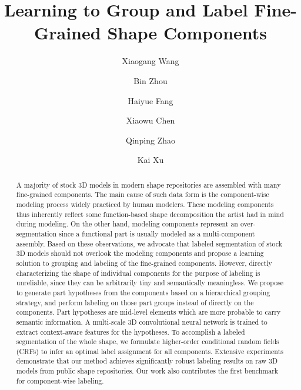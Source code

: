 \documentclass[acmtog]{acmart}
\newcommand{\new}[1]{{\color{black}#1}}
\newcommand{\wang}[1]{{\color{black}#1}}
\begin{document}


\title{Learning to Group and Label Fine-Grained Shape Components}


\author{Xiaogang Wang}
\author{Bin Zhou}
\author{Haiyue Fang}
\author{Xiaowu Chen}
\author{Qinping Zhao}
\author{Kai Xu}


\begin{abstract}
\new{A majority of stock 3D models in modern shape repositories are assembled
with many fine-grained components.
The main cause of such data form is the component-wise modeling process widely practiced by human modelers. These modeling components thus inherently reflect some function-based shape decomposition
the artist had in mind during modeling. On the other hand, modeling components represent
an over-segmentation since a functional part is usually modeled as a multi-component assembly.
Based on these observations, we advocate that labeled segmentation of stock 3D models
should not overlook the modeling components and propose a learning solution
to grouping and labeling of the fine-grained components.
However, directly characterizing the shape of individual components for the purpose of
labeling is unreliable, since they can be arbitrarily tiny and semantically meaningless.
\wang{
We propose to generate part hypotheses from the components based on a hierarchical grouping strategy,
and perform labeling on those part groups instead of directly on the components.
}
Part hypotheses are mid-level elements which are more probable to carry semantic information.
A multi-scale 3D convolutional neural network is trained to extract context-aware features for the hypotheses.
To accomplish a labeled segmentation of the whole shape, we
formulate higher-order conditional random fields (CRFs) to infer
an optimal label assignment for all components.
Extensive experiments demonstrate that our method achieves significantly robust labeling results
on raw 3D models from public shape repositories.
Our work also contributes the first benchmark for component-wise labeling.}
\end{abstract}
 
\end{document}
